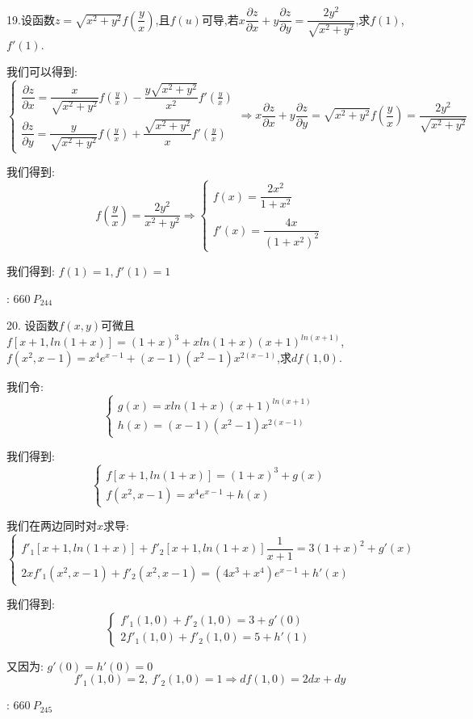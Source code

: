 19.设函数$z=\sqrt{x^2+y^2}f(\dfrac{y}{x})$,且$f(u)$可导,若$x\dfrac{\partial z}{\partial x}+y\dfrac{\partial z}{\partial y}=\dfrac{2y^2}{\sqrt{x^2+y^2}}$,求$f(1)$,$f'(1)$.
\begin{solution}
	
	我们可以得到:  
	$$\left\lbrace
	\begin{array}{l}
		\dfrac{\partial z}{\partial x}=\dfrac{x}{\sqrt{x^2+y^2}}f(\frac{y}{x})-\dfrac{y\sqrt{x^2+y^2}}{x^2}f'(\frac{y}{x})\\
		\dfrac{\partial z}{\partial y}=\dfrac{y}{\sqrt{x^2+y^2}}f(\frac{y}{x})+\dfrac{\sqrt{x^2+y^2}}{x}f'(\frac{y}{x})
	\end{array}
	\right. \Rightarrow x\dfrac{\partial z}{\partial x}+y\dfrac{\partial z}{\partial y}=\sqrt{x^2+y^2}f(\frac{y}{x})=\dfrac{2y^2}{\sqrt{x^2+y^2}}$$
	
	我们得到:  
	$$f(\frac{y}{x})=\dfrac{2y^2}{x^2+y^2}\Rightarrow \left\lbrace
	\begin{array}{l}
		f(x)=\dfrac{2x^2}{1+x^2}\\
		\\
		f'(x)=\dfrac{4x}{(1+x^2)^2}
	\end{array}
	\right. $$
	
	我们得到:  $f(1)=1,f'(1)=1$
\end{solution}
\begin{anymark}[注]
	[题目来源]:  $660 \ P_{244}$
\end{anymark}

20. 设函数$f(x,y)$可微且$f[x+1,ln(1+x)]=(1+x)^3+xln(1+x)(x+1)^{ln(x+1)}$,$f(x^2,x-1)=x^4e^{x-1}+(x-1)(x^2-1)x^{2(x-1)}$,求$df(1,0)$.
\begin{solution}
	
	我们令:  $$\left\lbrace
	\begin{array}{l}
		g(x)=xln(1+x)(x+1)^{ln(x+1)}\\
		h(x)=(x-1)(x^2-1)x^{2(x-1)}
	\end{array}
	\right. $$
	
	我们得到:  $$\left\lbrace
	\begin{array}{l}
		f[x+1,ln(1+x)]=(1+x)^3+g(x)\\
		f(x^2,x-1)=x^4e^{x-1}+h(x)
	\end{array}
	\right. $$
	
	我们在两边同时对$x$求导:  
	$$\left\lbrace
	\begin{array}{l}
		f'_{1}[x+1,ln(1+x)]+f'_{2}[x+1,ln(1+x)]\dfrac{1}{x+1}=3(1+x)^2+g'(x)\\
		2xf'_{1}(x^2,x-1)+f'_{2}(x^2,x-1)=(4x^3+x^4)e^{x-1}+h'(x)
	\end{array}
	\right. $$
	
	我们得到:  
	$$\left\lbrace
	\begin{array}{l}
		f'_{1}(1,0)+f'_{2}(1,0)=3+g'(0)\\
		2f'_{1}(1,0)+f'_{2}(1,0)=5+h'(1)
	\end{array}
	\right. $$
	
	又因为:  $g'(0)=h'(0)=0$
	$$f'_{1}(1,0)=2,\ f'_{2}(1,0)=1\Rightarrow df(1,0)=2dx+dy$$
\end{solution}
\begin{anymark}[注]
	[题目来源]:  $660 \ P_{245}$
\end{anymark}

